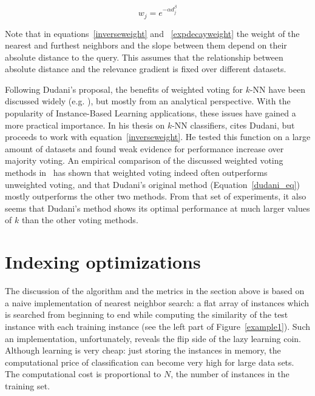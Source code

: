 \documentclass{report}
\begin{document}
\begin{equation}
\label{expdecayweight}
w_{j}= e^{-\alpha d_{j}^\beta}
\end{equation}

Note that in equations~\ref{inverseweight} and ~\ref{expdecayweight}
the weight of the nearest and furthest neighbors and the slope between
them depend on their absolute distance to the query. This assumes that
the relationship between absolute distance and the relevance gradient
is fixed over different datasets.

Following Dudani's proposal, the benefits of weighted voting for
$k$-NN have been discussed widely
(e.g. ), but mostly
from an analytical perspective. With the popularity of Instance-Based
Learning applications, these issues have gained a more practical
importance. In his thesis on $k$-NN classifiers,
 cites Dudani, but proceeds to work
with equation~\ref{inverseweight}. He tested this function on a large
amount of datasets and found weak evidence for performance increase
over majority voting. An empirical comparison of the discussed
weighted voting methods in~\cite{Zavrel97} has shown that weighted
voting indeed often outperforms unweighted voting, and that Dudani's
original method (Equation~\ref{dudani_eq}) mostly outperforms the
other two methods. From that set of experiments, it also seems that
Dudani's method shows its optimal performance at much larger values of
$k$ than the other voting methods.


\section{Indexing optimizations}
\label{indexing}

The discussion of the algorithm and the metrics in the section above
is based on a naive implementation of nearest neighbor search: a flat
array of instances which is searched from beginning to end while
computing the similarity of the test instance with each training
instance (see the left part of Figure~\ref{example1}). Such an
implementation, unfortunately, reveals the flip side of the lazy
learning coin. Although learning is very cheap: just storing the
instances in memory, the computational price of classification can
become very high for large data sets. The computational cost is
proportional to $N$, the number of instances in the training set.
\end{document}
